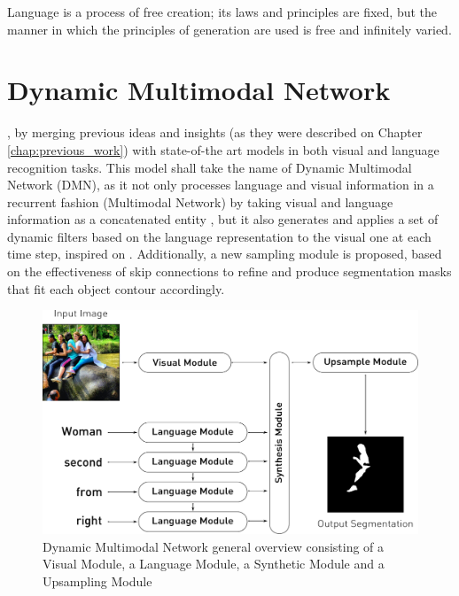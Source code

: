 \begin{savequote}[75mm]
Language is a process of free creation; its laws and principles are fixed, but the manner in which the principles of generation are used is free and infinitely varied.
\end{savequote}

\chapter{Dynamic Multimodal Network}

, by merging previous ideas and insights (as they were described on Chapter \ref{chap:previous_work}) with state-of-the art models in both visual and language recognition tasks. This model shall take the name of Dynamic Multimodal Network (DMN), as it not only processes language and visual information in a recurrent fashion \cite{li2017cvpr} (Multimodal Network) by taking visual and language information as a concatenated entity \cite{hu2016segmentation}, but it also generates and applies a set of dynamic filters based on the language representation to the visual one at each time step, inspired on \cite{liu2017segmentation}. Additionally, a new sampling module is proposed, based on the effectiveness of skip connections \cite{DBLP:journals/corr/RonnebergerFB15} to refine and produce segmentation masks that fit each object contour accordingly.


\begin{figure}
\centering
\includegraphics[width=\textwidth]{./figures/Model_Overview.pdf}
\caption{Dynamic Multimodal Network general overview consisting of a Visual Module, a Language Module, a Synthetic Module and a Upsampling Module}
\label{Fig:Overall}
\end{figure}

